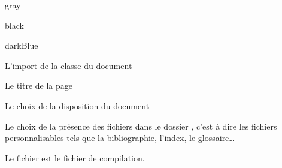 \begin{items}{gray}{\faFolder}
\begin{items}{black}{\Triangle}
        \begin{items}{darkBlue}{\Triangle}
            \item L'import de la classe du document
            \item Le titre de la page
            \item Le choix de la disposition du document
            \item Le choix de la présence des fichiers dans le dossier , c'est à dire les fichiers 
            personnalisables tels que la bibliographie, l'index, le glossaire\ldots
        \end{items} 
        \item Le fichier  est le fichier de compilation. 
    \end{items}
\end{items}


